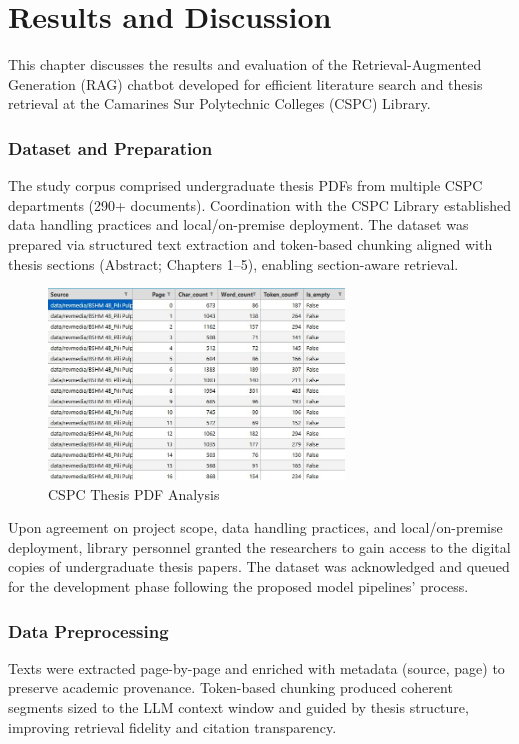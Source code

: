\chapter{Results and Discussion}
\begin{refsection}

This chapter discusses the results and evaluation of the Retrieval-Augmented Generation (RAG) chatbot developed for efficient literature search and thesis retrieval at the Camarines Sur Polytechnic Colleges (CSPC) Library.

\subsection{Dataset and Preparation}
The study corpus comprised undergraduate thesis PDFs from multiple CSPC departments (290+ documents). Coordination with the CSPC Library established data handling practices and local/on-premise deployment. The dataset was prepared via structured text extraction and token-based chunking aligned with thesis sections (Abstract; Chapters 1--5), enabling section-aware retrieval.


\begin{figure}[h]
    \centering
    \includegraphics[width=0.7\textwidth]{figures/doc_analysis.jpg}
    \caption{CSPC Thesis PDF Analysis}
\end{figure}

Upon agreement on project scope, data handling practices, and local/on-premise deployment, library personnel granted the researchers to gain access to the digital copies of undergraduate thesis papers. The dataset was acknowledged and queued for the development phase following the proposed model pipelines’ process.

\subsection{Data Preprocessing}
Texts were extracted page-by-page and enriched with metadata (source, page) to preserve academic provenance. Token-based chunking produced coherent segments sized to the LLM context window and guided by thesis structure, improving retrieval fidelity and citation transparency.


\end{refsection}
